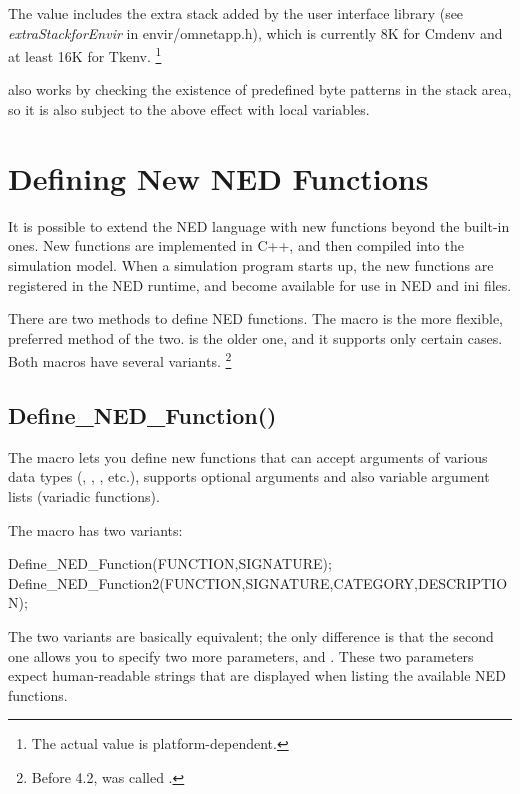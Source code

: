 The value includes the extra stack added by the user interface library
(see \textit{extraStackforEnvir} in
envir/omnetapp.h), which is currently 8K for Cmdenv and at least 16K
for Tkenv.
  \footnote{The actual value is platform-dependent.}

 also works by checking the existence of predefined
byte patterns in the stack area, so it is also subject to the above
effect with local variables.


\section{Defining New NED Functions\new}
\label{sec:ch-sim-lib:defining-ned-functions}

It is possible to extend the NED language with new functions beyond the
built-in ones. New functions are implemented in C++, and then compiled into
the simulation model. When a simulation program starts up, the new
functions are registered in the NED runtime, and become available for use
in NED and ini files.

There are two methods to define NED functions. The
 macro is the more flexible, preferred method
of the two.  is the older one, and it
supports only certain cases. Both macros have several variants.
  \footnote{Before {\opp} 4.2,  was
  called .}

\subsection{Define\_NED\_Function()}

The  macro lets you define new functions that
can accept arguments of various data types (, ,
, etc.), supports optional arguments and also variable
argument lists (variadic functions).

The macro has two variants:

\begin{cpp}
Define_NED_Function(FUNCTION,SIGNATURE);
Define_NED_Function2(FUNCTION,SIGNATURE,CATEGORY,DESCRIPTION);
\end{cpp}

The two variants are basically equivalent; the only difference is that the
second one allows you to specify two more parameters,  and
. These two parameters expect human-readable strings that
are displayed when listing the available NED functions.

